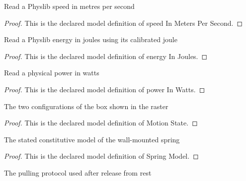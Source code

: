 \begin{definition}
  \label{def:physics:phyx-mini-0695:phyxminiproblems-problemphyxmini0695-speedinmeterspersecond}
  Read a Physlib speed in metres per second
\end{definition}
\begin{proof}
  This is the declared model definition of speed In Meters Per Second.
\end{proof}
\begin{definition}
  \label{def:physics:phyx-mini-0695:phyxminiproblems-problemphyxmini0695-energyinjoules}
  Read a Physlib energy in joules using its calibrated joule
\end{definition}
\begin{proof}
  This is the declared model definition of energy In Joules.
\end{proof}
\begin{definition}
  \label{def:physics:phyx-mini-0695:phyxminiproblems-problemphyxmini0695-powerinwatts}
  Read a physical power in watts
\end{definition}
\begin{proof}
  This is the declared model definition of power In Watts.
\end{proof}
\begin{definition}
  \label{def:physics:phyx-mini-0695:phyxminiproblems-problemphyxmini0695-motionstate}
  The two configurations of the box shown in the raster
\end{definition}
\begin{proof}
  This is the declared model definition of Motion State.
\end{proof}
\begin{definition}
  \label{def:physics:phyx-mini-0695:phyxminiproblems-problemphyxmini0695-springmodel}
  The stated constitutive model of the wall-mounted spring
\end{definition}
\begin{proof}
  This is the declared model definition of Spring Model.
\end{proof}
\begin{definition}
  \label{def:physics:phyx-mini-0695:phyxminiproblems-problemphyxmini0695-pullingprotocol}
  The pulling protocol used after release from rest
\end{definition}
